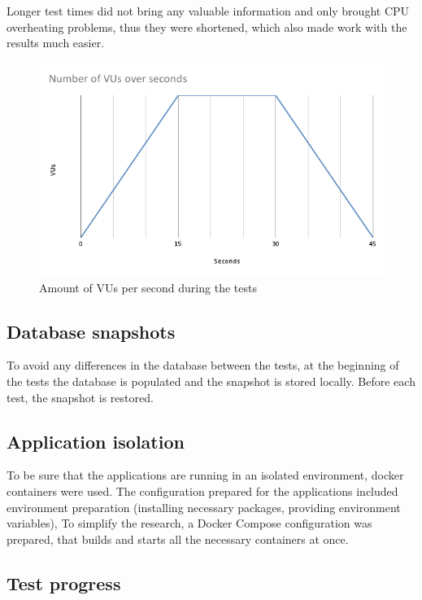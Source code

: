 Longer test times did not bring any valuable information and only brought CPU overheating problems, thus they were shortened, which also made work with the results much easier.

\begin{figure}[H]
    \includegraphics[width=\columnwidth]{pictures/vusPerSecond.png}
    \caption{Amount of VUs per second during the tests}
    \label{fig:vusPerSecond}
\end{figure}


\subsection{Database snapshots}

To avoid any differences in the database between the tests, at the beginning of the tests the database is populated and the snapshot is stored locally. Before each test, the snapshot is restored.

\subsection{Application isolation}

To be sure that the applications are running in an isolated environment, docker containers were used. The configuration prepared for the applications included environment preparation (installing necessary packages, providing environment variables), To simplify the research, a Docker Compose configuration was prepared, that builds and starts all the necessary containers at once.

\subsection{Test progress}

